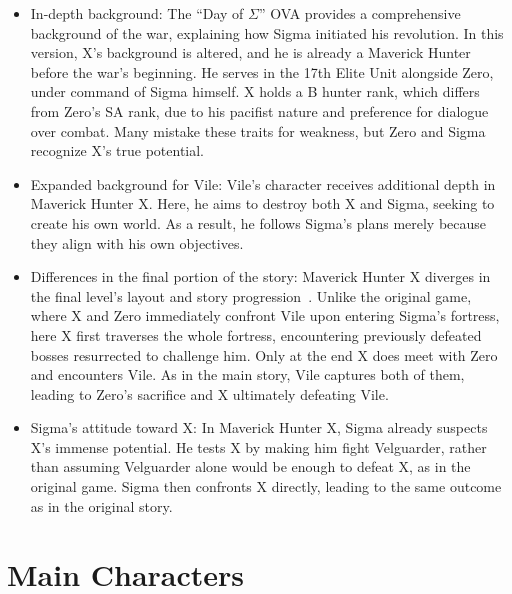 \begin{itemize}
	
\item In-depth background: The ``Day of $\Sigma$'' OVA provides a comprehensive background of the war, explaining how Sigma initiated his revolution. In this version, X's background is altered, and he is already a Maverick Hunter before the war's beginning. He serves in the 17th Elite Unit alongside Zero, under command of Sigma himself. X holds a B hunter rank, which differs from Zero's SA rank, due to his pacifist nature and preference for dialogue over combat. Many mistake these traits for weakness, but Zero and Sigma recognize X's true potential.

\item Expanded background for Vile: Vile's character receives additional depth in Maverick Hunter X. Here, he aims to destroy both X and Sigma, seeking to create his own world. As a result, he follows Sigma's plans merely because they align with his own objectives.

\item Differences in the final portion of the story: Maverick Hunter X diverges in the final level's layout and story progression~\cite{wiki:MM_MHX_script}. Unlike the original game, where X and Zero immediately confront Vile upon entering Sigma's fortress, here X first traverses the whole fortress, encountering previously defeated bosses resurrected to challenge him. Only at the end X does meet with Zero and encounters Vile. As in the main story, Vile captures both of them, leading to Zero's sacrifice and X ultimately defeating Vile.

\item Sigma's attitude toward X: In Maverick Hunter X, Sigma already suspects X's immense potential. He tests X by making him fight Velguarder, rather than assuming Velguarder alone would be enough to defeat X, as in the original game. Sigma then confronts X directly, leading to the same outcome as in the original story.

\end{itemize}


\section{Main Characters}
